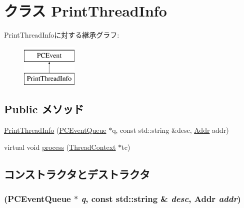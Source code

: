 \hypertarget{classLinuxMipsSystem_1_1PrintThreadInfo}{
\section{クラス PrintThreadInfo}
\label{classLinuxMipsSystem_1_1PrintThreadInfo}
}
PrintThreadInfoに対する継承グラフ:\begin{figure}[H]
\begin{center}
\leavevmode
\includegraphics[height=2cm]{classLinuxMipsSystem_1_1PrintThreadInfo}
\end{center}
\end{figure}
\subsection*{Public メソッド}
\begin{DoxyCompactItemize}
\item 
\hyperlink{classLinuxMipsSystem_1_1PrintThreadInfo_a4359f2ff3627c3655ab7d570c74e8f2e}{PrintThreadInfo} (\hyperlink{classPCEventQueue}{PCEventQueue} $\ast$q, const std::string \&desc, \hyperlink{base_2types_8hh_af1bb03d6a4ee096394a6749f0a169232}{Addr} addr)
\item 
virtual void \hyperlink{classLinuxMipsSystem_1_1PrintThreadInfo_ad66a9d5ec7cfe597b848a17c0df5cc28}{process} (\hyperlink{classThreadContext}{ThreadContext} $\ast$tc)
\end{DoxyCompactItemize}


\subsection{コンストラクタとデストラクタ}
\hypertarget{classLinuxMipsSystem_1_1PrintThreadInfo_a4359f2ff3627c3655ab7d570c74e8f2e}{
\subsubsection[{PrintThreadInfo}]{ ({\bf PCEventQueue} $\ast$ {\em q}, \/  const std::string \& {\em desc}, \/  {\bf Addr} {\em addr})}}
\label{classLinuxMipsSystem_1_1PrintThreadInfo_a4359f2ff3627c3655ab7d570c74e8f2e}



